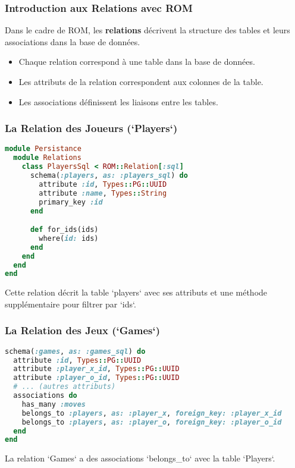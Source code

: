 \begin{frame}
  \frametitle{Introduction aux Relations avec ROM}
  Dans le cadre de ROM, les \textbf{relations} décrivent la structure des tables et leurs associations dans la base de données.

  \begin{itemize}
    \item Chaque relation correspond à une table dans la base de données.
    \item Les attributs de la relation correspondent aux colonnes de la table.
    \item Les associations définissent les liaisons entre les tables.
  \end{itemize}
\end{frame}

\begin{frame}[fragile]
  \frametitle{La Relation des Joueurs (`Players`)}

  \begin{lstlisting}[language=Ruby]
module Persistance
  module Relations
    class PlayersSql < ROM::Relation[:sql]
      schema(:players, as: :players_sql) do
        attribute :id, Types::PG::UUID
        attribute :name, Types::String
        primary_key :id
      end

      def for_ids(ids)
        where(id: ids)
      end
    end
  end
end
  \end{lstlisting}

  Cette relation décrit la table `players` avec ses attributs et une méthode supplémentaire pour filtrer par `ids`.
\end{frame}

\begin{frame}[fragile]
  \frametitle{La Relation des Jeux (`Games`)}

  \begin{lstlisting}[language=Ruby]
schema(:games, as: :games_sql) do
  attribute :id, Types::PG::UUID
  attribute :player_x_id, Types::PG::UUID
  attribute :player_o_id, Types::PG::UUID
  # ... (autres attributs)
  associations do
    has_many :moves
    belongs_to :players, as: :player_x, foreign_key: :player_x_id
    belongs_to :players, as: :player_o, foreign_key: :player_o_id
  end
end
  \end{lstlisting}

  La relation `Games` a des associations `belongs\_to` avec la table `Players`.
\end{frame}
